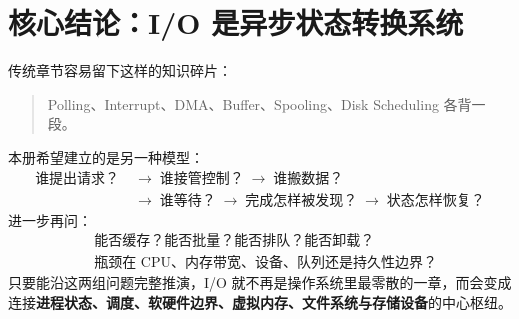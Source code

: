 \documentclass[UTF8,fontset=fandol,11pt,a4paper]{ctexart}
\newcommand{\kw}[1]{\textbf{#1}}
\newcommand{\arr}{\;\longrightarrow\;}
\begin{document}
\section{核心结论：I/O 是异步状态转换系统}
传统章节容易留下这样的知识碎片：
\begin{quote}
Polling、Interrupt、DMA、Buffer、Spooling、Disk Scheduling 各背一段。
\end{quote}
本册希望建立的是另一种模型：
\[
\boxed{
\begin{aligned}
\text{谁提出请求？}&\arr\text{谁接管控制？}\arr\text{谁搬数据？}\\
&\arr\text{谁等待？}\arr\text{完成怎样被发现？}\arr\text{状态怎样恢复？}
\end{aligned}}
\]
进一步再问：
\[
\boxed{
\begin{aligned}
&\text{能否缓存？能否批量？能否排队？能否卸载？}\\
&\text{瓶颈在 CPU、内存带宽、设备、队列还是持久性边界？}
\end{aligned}}
\]
只要能沿这两组问题完整推演，I/O 就不再是操作系统里最零散的一章，而会变成连接\kw{进程状态、调度、软硬件边界、虚拟内存、文件系统与存储设备}的中心枢纽。

\newpage
\end{document}
